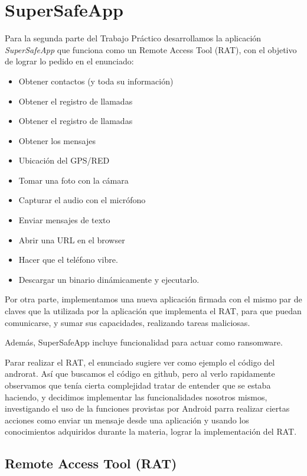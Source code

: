 \newpage
\section{SuperSafeApp}

Para la segunda parte del Trabajo Práctico desarrollamos la aplicación \emph{SuperSafeApp} que funciona como un Remote Access Tool (RAT), con el objetivo de lograr lo pedido en el enunciado:

\begin{itemize}
\item Obtener contactos (y toda su información)
\item Obtener el registro de llamadas
\item Obtener el registro de llamadas
\item Obtener los mensajes
\item Ubicación del GPS/RED
\item Tomar una foto con la cámara
\item Capturar el audio con el micrófono
\item Enviar mensajes de texto
\item Abrir una URL en el browser
\item Hacer que el teléfono vibre.
\item Descargar un binario dinámicamente y ejecutarlo.
\end{itemize}

Por otra parte, implementamos una nueva aplicación firmada con el mismo par de claves que la utilizada por la aplicación que implementa el RAT, para que puedan comunicarse, y sumar sus capacidades, realizando tareas maliciosas.

Además, SuperSafeApp incluye funcionalidad para actuar como ransomware.


Parar realizar el RAT, el enunciado sugiere ver como ejemplo el código del androrat. Así que buscamos el código en github, pero al verlo rapidamente observamos que tenía cierta complejidad tratar de entender que se estaba haciendo, y decidimos implementar las funcionalidades nosotros mismos, investigando el uso de la funciones provistas por Android parra realizar ciertas acciones como enviar un mensaje desde una aplicación y usando los conocimientos adquiridos durante la materia, lograr la implementación del RAT.


\subsection{Remote Access Tool (RAT)}

